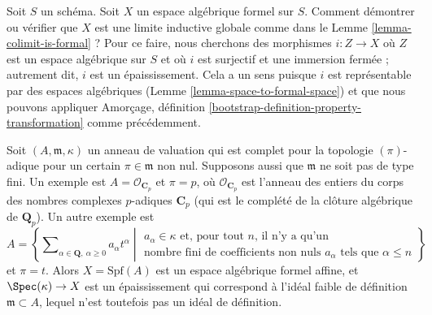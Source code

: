 \noindent
Soit $S$ un schéma. Soit $X$ un espace algébrique formel sur $S$.
Comment démontrer ou vérifier que $X$ est une limite inductive globale comme dans le
Lemme \ref{lemma-colimit-is-formal} ? Pour ce faire, nous cherchons des morphismes
$i : Z \to X$ où $Z$ est un espace algébrique sur $S$ et où $i$ est
surjectif et une immersion fermée ; autrement dit, $i$ est un épaississement.
Cela a un sens puisque $i$ est représentable par des espaces algébriques
(Lemme \ref{lemma-space-to-formal-space}) et que nous pouvons appliquer
Amorçage, définition \ref{bootstrap-definition-property-transformation}
comme précédemment.

\begin{example}
\label{example-david-hansen}
Soit $(A, \mathfrak m, \kappa)$ un anneau de valuation qui est
complet pour la topologie $(\pi)$-adique pour un certain $\pi \in \mathfrak m$ non nul.
Supposons aussi que $\mathfrak m$ ne soit pas de type fini.
Un exemple est $A = \mathcal{O}_{\mathbf{C}_p}$ et $\pi = p$,
où $\mathcal{O}_{\mathbf{C}_p}$ est l'anneau des entiers
du corps des nombres complexes $p$-adiques $\mathbf{C}_p$
(qui est le complété de la clôture algébrique de
$\mathbf{Q}_p$). Un autre exemple est
$$
A =
\left\{
\sum\nolimits_{\alpha \in \mathbf{Q},\ \alpha \geq 0} a_\alpha t^\alpha
\middle|
\begin{matrix}
a_\alpha \in \kappa \text{ et, pour tout }n\text{, il n'y a qu'un} \\
\text{nombre fini de coefficients non nuls }a_\alpha
\text{ tels que }\alpha \leq n
\end{matrix}
\right\}
$$
et $\pi = t$. Alors $X = \text{Spf}(A)$ est un espace algébrique formel
affine, et $\Spec(\kappa) \to X$ est un épaississement qui correspond
à l'idéal faible de définition $\mathfrak m \subset A$,
lequel n'est toutefois pas un idéal de définition.
\end{example}

